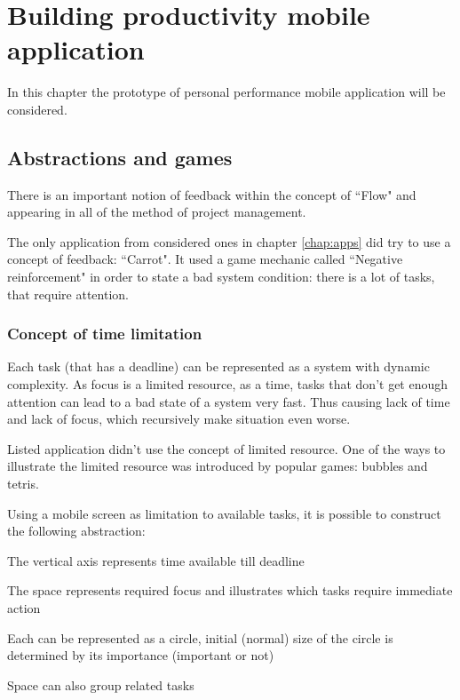 \chapter{Building productivity mobile application}

In this chapter the prototype of personal performance mobile application will be considered.

\section{Abstractions and games}
There is an important notion of feedback within the concept of ``Flow" and appearing in all of the method of project management.

The only application from considered ones in chapter \ref{chap:apps} did try to use a concept of feedback: ``Carrot". It used a game mechanic called ``Negative reinforcement" in order to state a bad system condition: there is a lot of tasks, that require attention.

\subsection{Concept of time limitation}

Each task (that has a deadline) can be represented as a system with dynamic complexity. As focus is a limited resource, as a time, tasks that don't get enough attention can lead to a bad state of a system very fast. Thus causing lack of time and lack of focus, which recursively make situation even worse.

Listed application didn't use the concept of limited resource. One of the ways to illustrate the limited resource was introduced by popular games: bubbles and tetris.

Using a mobile screen as limitation to available tasks, it is possible to construct the following abstraction:

\begin{compactitem}
\item The vertical axis represents time available till deadline
\item The space represents required focus and illustrates which tasks require immediate action
\item Each can be represented as a circle, initial (normal) size of the circle is determined by its importance (important or not)
\item Space can also group related tasks
\end{compactitem}


